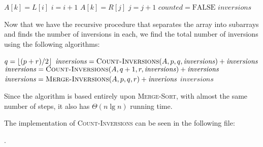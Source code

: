 \begin{itemize}
\begin{algorithmic}[1]
                    \STATE $A[k] = L[i]$
                    \STATE $i = i + 1$
                \ELSE
                    \STATE $A[k] = R[j]$
                    \STATE $j = j + 1$
                    \STATE $\mathit{counted} = \textrm{FALSE}$
                \ENDIF
            \ENDFOR
            \RETURN $\mathit{inversions}$
        \end{algorithmic}

        Now that we have the recursive procedure that separates the array into subarrays
        and finds the number of inversions in each, we find the total number of inversions
        using the following algorithms:
        \begin{algorithmic}[1]
                    \STATE $q = \lfloor(p + r)/2\rfloor$
                    \STATE $\mathit{inversions} 
                        = \textsc{Count-Inversions}(A, p, q, \mathit{inversions}) +
                        \mathit{inversions}$
                    \STATE $\mathit{inversions} 
                        = \textsc{Count-Inversions}(A, q + 1, r, \mathit{inversions}) +
                        \mathit{inversions}$
                    \STATE $\mathit{inversions} 
                        = \textsc{Merge-Inversions}(A, p, q, r) + \mathit{inverions}$
                \ENDIF
                \RETURN $\mathit{inversions}$
        \end{algorithmic}

        Since the algorithm is based entirely upon \textsc{Merge-Sort}, with almost the
        same number of steps, it also has $\Theta(n\lg{n})$ running time.
\end{itemize}

The implementation of \textsc{Count-Inversions} can be seen in the following file:

.
